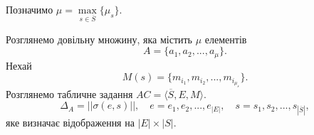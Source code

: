 Позначимо $\mu = \max\limits_{s \in \overline{S}}\{\mu_s\}$.

Розглянемо довільну множину, яка містить $\mu$ елементів
\begin{equation*}
    A = \{a_1, a_2, ..., a_{\mu}\}.
\end{equation*}
Нехай
\begin{equation*}
    M(s) = \{m_{i_1}, m_{i_2}, ..., m_{i_{\mu_s}}\}.
\end{equation*}
Розглянемо табличне задання $AC = \langle \overline{S}, E, M \rangle$.
\begin{equation*}
    \Delta_A = ||\sigma(e, s)||, \quad e = e_1, e_2, ..., e_{|E|}, \quad s = s_1, s_2, ..., s_{|\overline{S}|},
\end{equation*}
яке визначає відображення на $|E| \times|S|$.

